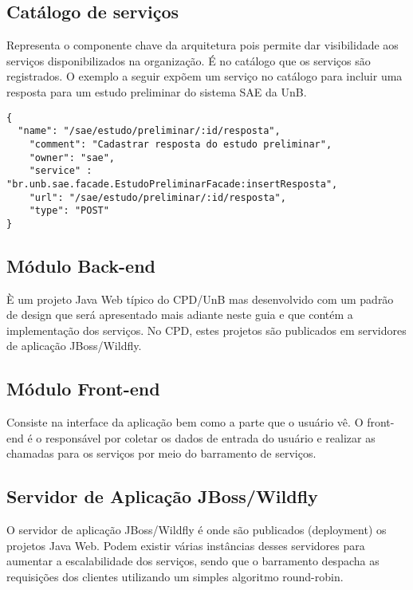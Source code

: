 \subsection{Catálogo de serviços}

Representa o componente chave da arquitetura pois permite
dar visibilidade aos serviços disponibilizados na organização. É no catálogo que 
os serviços são registrados. O exemplo a seguir expõem um serviço no catálogo 
para incluir uma resposta para um estudo preliminar do sistema SAE da UnB.


\renewcommand{\lstlistingname}{Código}             
\begin{lstlisting}[caption=Exemplo de um serviço no catálogo de serviços., label=fig:catalogo_processo] 
{
  "name": "/sae/estudo/preliminar/:id/resposta",
	"comment": "Cadastrar resposta do estudo preliminar",
	"owner": "sae",
	"service" : "br.unb.sae.facade.EstudoPreliminarFacade:insertResposta",
	"url": "/sae/estudo/preliminar/:id/resposta",
	"type": "POST"
}
\end{lstlisting}


\subsection{Módulo Back-end}

È um projeto Java Web típico do CPD/UnB
mas desenvolvido com um padrão de design que será apresentado mais adiante neste 
guia e que contém a implementação dos serviços. No CPD, estes projetos
são publicados em servidores de aplicação JBoss/Wildfly.

\subsection{Módulo Front-end}

Consiste na interface da aplicação bem como a parte que o usuário vê. O front-end é o responsável por coletar os dados de entrada do usuário
e realizar as chamadas para os serviços por meio do barramento de serviços.

\subsection{Servidor de Aplicação JBoss/Wildfly}

O servidor de aplicação JBoss/Wildfly é onde são publicados (deployment)
os projetos Java Web. Podem existir várias instâncias desses servidores para
aumentar a escalabilidade dos serviços, sendo que o barramento despacha
as requisições dos clientes utilizando um simples algoritmo round-robin.

